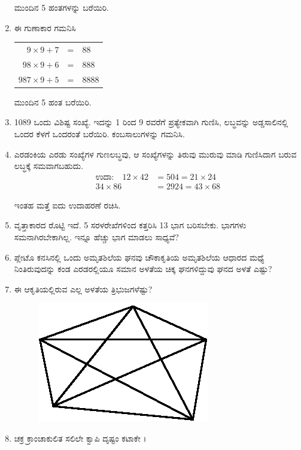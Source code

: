 \begin{enumerate}
ಮುಂದಿನ 5 ಹಂತಗಳನ್ನು ಬರೆಯಿರಿ. 

\item ಈ ಗುಣಾಕಾರ ಗಮನಿಸಿ 

\begin{tabular}{rcl}
$9 \times 9 + 7$ & = & $88$\\
$98 \times 9 + 6$ & = & $888$\\
$987 \times 9 + 5$ & = & $8888$
\end{tabular}

ಮುಂದಿನ 5 ಹಂತ ಬರೆಯಿರಿ.

\item 1089 ಒಂದು ವಿಶಿಷ್ಟ ಸಂಖ್ಯೆ. ಇದನ್ನು 1 ರಿಂದ 9 ರವರೆಗೆ ಪ್ರತ್ಯೇಕವಾಗಿ ಗುಣಿಸಿ, ಲಬ್ಧವನ್ನು ಅಡ್ಡಸಾಲಿನಲ್ಲಿ ಒಂದರ ಕೆಳಗೆ ಒಂದರಂತೆ ಬರೆಯಿರಿ. ಕಂಬಸಾಲುಗಳನ್ನು ಗಮನಿಸಿ.

\item ಎರಡಂಕಿಯ ಎರಡು ಸಂಖ್ಯೆಗಳ ಗುಣಲಬ್ಧವು, ಆ ಸಂಖ್ಯೆಗಳನ್ನು ತಿರುವು ಮುರುವು ಮಾಡಿ ಗುಣಿಸಿದಾಗ ಬರುವ ಲಬ್ಧಕ್ಕೆ ಸಮವಾಗಬಹುದು.
\begin{align*}
\text{ಉದಾ:}\quad 12 \times 42 & = 504 = 21 \times 24\\
34 \times 86 & = 2924 = 43 \times 68
\end{align*}

ಇಂತಹ ಮತ್ತೆ ಐದು ಉದಾಹರಣೆ ರಚಿಸಿ.

\item ವೃತ್ತಾಕಾರದ ರೊಟ್ಟಿ ಇದೆ. 5 ಸರಳರೇಖೆಗಳಿಂದ ಕತ್ತರಿಸಿ 13 ಭಾಗ ಬರಿಸಬೇಕು. ಭಾಗಗಳು ಸಮನಾಗಿರಬೇಕಾಗಿಲ್ಲ. ಇನ್ನೂ ಹೆಚ್ಚು ಭಾಗ ಮಾಡಲು ಸಾಧ್ಯವೆ? 

\item ಪ್ಲೇಟೊ ಕನಸಿನಲ್ಲಿ ಒಂದು ಅಮೃತಶಿಲೆಯ ಘನವು ಚೌಕಾಕೃತಿಯ ಅಮೃತಶಿಲೆಯ ಆಧಾರದ ಮಧ್ಯೆ ನಿಂತಿರುವುದನ್ನು ಕಂಡ ಎರಡರಲ್ಲಿಯೂ ಸಮಾನ ಅಳತೆಯ ಚಿಕ್ಕ ಘನಗಳಿದ್ದುವು ಘನದ ಅಳತೆ ಎಷ್ಟು?

\item ಈ ಆಕೃತಿಯಲ್ಲಿರುವ ಎಲ್ಲ ಅಳತೆಯ ತ್ರಿಭುಜಗಳೆಷ್ಟು?

\begin{figure}[H]
\centering
\includegraphics{images/chap4/q25.eps}
\end{figure}

\item ಚಕ್ರ ಕ್ರಾಂಚಾಕುಲಿತ ಸಲಿಲೇ ಕ್ವಾಪಿ ದೃಷ್ಟಂ ಕಟಾಕೇ । 


\end{enumerate}
